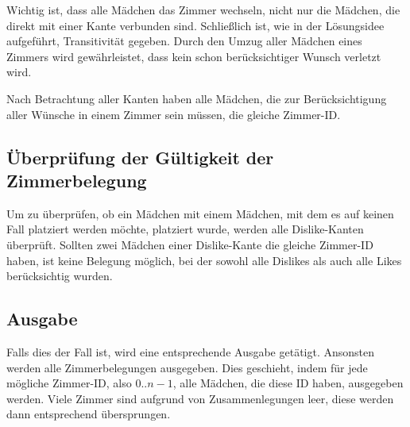 Wichtig ist, dass alle Mädchen das Zimmer wechseln, nicht nur die Mädchen, die direkt mit einer Kante verbunden sind. Schließlich ist, wie in der Lösungsidee aufgeführt, Transitivität gegeben. Durch den Umzug aller Mädchen eines Zimmers wird gewährleistet, dass kein schon berücksichtiger Wunsch verletzt wird.

Nach Betrachtung aller Kanten haben alle Mädchen, die zur Berücksichtigung aller Wünsche in einem Zimmer sein müssen, die gleiche Zimmer-ID.

\subsection{Überprüfung der Gültigkeit der Zimmerbelegung}
Um zu überprüfen, ob ein Mädchen mit einem Mädchen, mit dem es auf keinen Fall platziert werden möchte, platziert wurde, werden alle Dislike-Kanten überprüft. Sollten zwei Mädchen einer Dislike-Kante die gleiche Zimmer-ID haben, ist keine Belegung möglich, bei der sowohl alle Dislikes als auch alle Likes berücksichtig wurden.

\subsection{Ausgabe}
Falls dies der Fall ist, wird eine entsprechende Ausgabe getätigt. 
Ansonsten werden alle Zimmerbelegungen ausgegeben. Dies geschieht, indem für jede mögliche Zimmer-ID, also \(0 .. n-1\), alle Mädchen, die diese ID haben, ausgegeben werden. Viele Zimmer sind aufgrund von Zusammenlegungen leer, diese werden dann entsprechend übersprungen.
